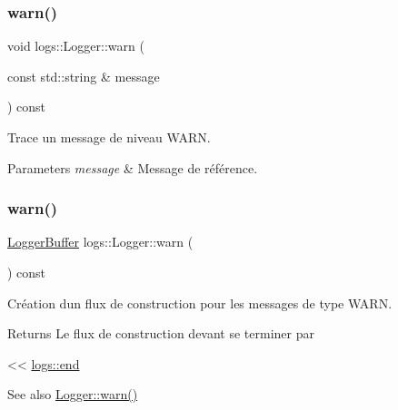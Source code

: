 \subsubsection{\texorpdfstring{warn()}{warn()}\hspace{0.1cm}{\footnotesize\ttfamily [1/2]}}
{\footnotesize\ttfamily void logs\+::\+Logger\+::warn (\begin{DoxyParamCaption}\item[{const std\+::string \&}]{message }\end{DoxyParamCaption}) const\hspace{0.3cm}{\ttfamily [inline]}}



Trace un message de niveau W\+A\+RN. 


\begin{DoxyParams}{Parameters}
{\em message} & Message de référence. \\
\hline
\end{DoxyParams}
\mbox{\label{classlogs_1_1Logger_a2741020406e22491e124f646c6cf39a7}} 
\subsubsection{\texorpdfstring{warn()}{warn()}\hspace{0.1cm}{\footnotesize\ttfamily [2/2]}}
{\footnotesize\ttfamily \hyperlink{classlogs_1_1Logger_1_1LoggerBuffer}{Logger\+Buffer} logs\+::\+Logger\+::warn (\begin{DoxyParamCaption}{ }\end{DoxyParamCaption}) const\hspace{0.3cm}{\ttfamily [inline]}}



Création d\textquotesingle{}un flux de construction pour les messages de type W\+A\+RN. 

\begin{DoxyReturn}{Returns}
Le flux de construction devant se terminer par
\begin{DoxyCode}
<< \hyperlink{Logger_8hpp_ac6f325c6cfe6189bc8e243daa184453b}{logs::end} 
\end{DoxyCode}
 
\end{DoxyReturn}
\begin{DoxySeeAlso}{See also}
\hyperlink{classlogs_1_1Logger_a240e8d7b58195c85bd7b4e4a3417d955}{Logger\+::warn()} 
\end{DoxySeeAlso}
\mbox{\label{classlogs_1_1Logger_afa535aaf4891e02c4ff7f84d372b5b1b}} 
